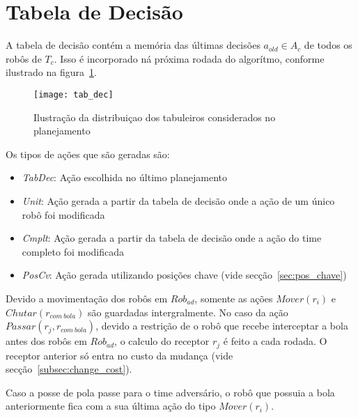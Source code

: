 \section{Tabela de Decisão}\label{sec:tab_dec}
A tabela de decisão contém a memória das últimas
decisões $a_{old} \in A_c$ de todos os robôs de $T_c$.
Isso é incorporado ná próxima rodada do algorítmo,
conforme ilustrado na figura~\ref{fig:tab_dec}.

\begin{figure}
  \centering
  \texttt{[image: tab\_dec]}
  \caption{Ilustração da distribuiçao dos tabuleiros
           considerados no planejamento}\label{fig:tab_dec}
\end{figure}

Os tipos de ações que são geradas são:
\begin{itemize}
  \item \textit{TabDec}: Ação escolhida no último planejamento
  \item \textit{Unit}: Ação gerada a partir da tabela de decisão
        onde a ação de um único robô foi modificada
  \item \textit{Cmplt}: Ação gerada a partir da tabela de decisão
        onde a ação do time completo foi modificada
  \item \textit{PosCv}: Ação gerada utilizando posições chave
        (vide secção~\ref{sec:pos_chave})
\end{itemize}

Devido a movimentação dos robôs em $Rob_{ad}$, somente as
ações $Mover(r_i)$ e $Chutar(r_{com{\ }bola})$ são guardadas
intergralmente. No caso da ação $Passar(r_j, r_{com{\ }bola})$,
devido a restrição de o robô que recebe interceptar a bola
antes dos robôs em $Rob_{ad}$, o calculo do receptor $r_j$ é
feito a cada rodada. O receptor anterior só entra no custo
da mudança (vide secção~\ref{subsec:change_cost}). 

Caso a posse de pola passe para o time adversário, o robô
que possuia a bola anteriormente fica com a sua última
ação do tipo $Mover(r_i)$.
